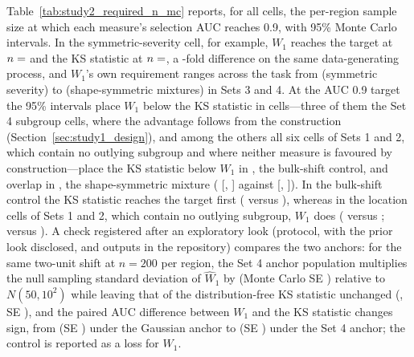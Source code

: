 \documentclass[AMA,Times1COL]{WileyNJDv5}
\begin{document}
Table~\ref{tab:study2_required_n_mc} reports, for all  cells, the per-region sample size at which each measure's selection AUC reaches 0.9, with 95\% Monte Carlo intervals. In the symmetric-severity cell, for example, $W_1$ reaches the target at $n = \numval{reqnW1Set4symsevB}$ and the KS statistic at $n = \numval{reqnKSSet4symsev}$, a -fold difference on the same data-generating process, and $W_1$'s own requirement ranges across the task from  (symmetric severity) to  (shape-symmetric mixtures) in Sets 3 and 4. At the AUC 0.9 target the 95\% intervals place $W_1$ below the KS statistic in  cells---three of them the Set 4 subgroup cells, where the advantage follows from the construction (Section~\ref{sec:study1_design}), and among the others all six cells of Sets 1 and 2, which contain no outlying subgroup and where neither measure is favoured by construction---place the KS statistic below $W_1$ in , the bulk-shift control, and overlap in , the shape-symmetric mixture ( [, ] against  [, ]). In the bulk-shift control the KS statistic reaches the target first ( versus ), whereas in the location cells of Sets 1 and 2, which contain no outlying subgroup, $W_1$ does ( versus ;  versus ). A check registered after an exploratory look (protocol, with the prior look disclosed, and outputs in the repository) compares the two anchors: for the same two-unit shift at $n = 200$ per region, the Set 4 anchor population multiplies the null sampling standard deviation of $\widehat{W}_1$ by  (Monte Carlo SE ) relative to $N(50, 10^2)$ while leaving that of the distribution-free KS statistic unchanged (, SE ), and the paired AUC difference between $W_1$ and the KS statistic changes sign, from  (SE ) under the Gaussian anchor to  (SE ) under the Set 4 anchor; the control is reported as a loss for $W_1$.
\end{document}

